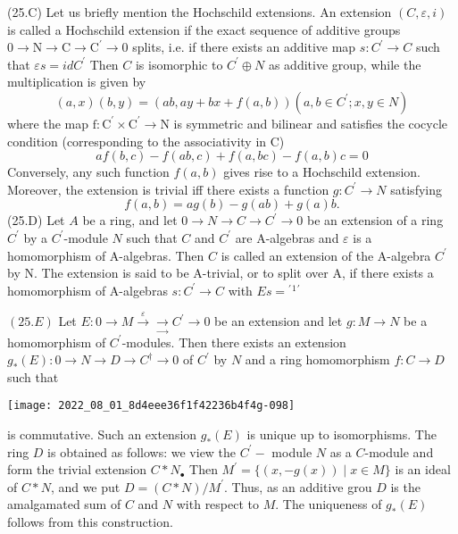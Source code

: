 (25.C) Let us briefly mention the Hochschild extensions. An extension $(C, \varepsilon, i)$ is called a Hochschild extension if the exact sequence of additive groups $0 \rightarrow \mathrm{N} \rightarrow \mathrm{C} \rightarrow \mathrm{C}^{\prime} \rightarrow 0$ splits, i.e. if there exists an additive map $s: C^{\prime} \rightarrow C$ such that $\varepsilon s=i d C^{\prime}$ Then $C$ is isomorphic to $C^{\prime} \oplus N$ as additive group, while the multiplication is given by
$$
(a, x)(b, y)=(a b, a y+b x+f(a, b))\left(a, b \in C^{\prime} ; x, y \in N\right)
$$
where the map $\mathrm{f}: \mathrm{C}^{\prime} \times \mathrm{C}^{\prime} \rightarrow \mathrm{N}$ is symmetric and bilinear and satisfies the cocycle condition (corresponding to the associativity in C)
$$
a f(b, c)-f(a b, c)+f(a, b c)-f(a, b) c=0
$$
Conversely, any such function $f(a, b)$ gives rise to a Hochschild extension. Moreover, the extension is trivial iff there exists a function $g: C^{\prime} \rightarrow N$ satisfying
$$
f(a, b)=a g(b)-g(a b)+g(a) b .
$$
(25.D) Let $A$ be a ring, and let $0 \rightarrow N \rightarrow C \rightarrow C^{\prime} \rightarrow 0$ be an extension of a ring $C^{\prime}$ by a $C^{\prime}$-module $N$ such that $C$ and $C^{\prime}$ are A-algebras and $\varepsilon$ is a homomorphism of A-algebras. Then $C$ is called an extension of the A-algebra $C^{\prime}$ by $\mathrm{N} .$ The extension is said to be A-trivial, or to split over A, if there exists a homomorphism of A-algebras $s: C^{\prime} \rightarrow C$ with $E s={ }^{\prime}{ }^{1}{ }^{\prime}$

$(25 . E)$ Let $E: 0 \rightarrow M \stackrel{\varepsilon}{\rightarrow} \underset{\rightarrow}{\rightarrow} C^{\prime} \rightarrow 0$ be an extension and let $g: M \rightarrow N$ be a homomorphism of $C^{\prime}$-modules. Then there exists an extension $g_{*}(E): 0 \rightarrow N \rightarrow D \rightarrow C^{\dagger} \rightarrow 0$ of $C^{\prime}$ by $N$ and a ring homomorphism $f: C \rightarrow D$ such that

\texttt{[image: 2022\_08\_01\_8d4eee36f1f42236b4f4g-098]}

is commutative. Such an extension $g_{*}(E)$ is unique up to isomorphisms. The ring $D$ is obtained as follows: we view the $C^{\prime}-$ module $N$ as a $C$-module and form the trivial extension $C * N_{\bullet}$ Then $M^{\prime}=\{(x,-g(x)) \mid x \in M\}$ is an ideal of $C * N$, and we put $D=(C * N) / M^{\prime}$. Thus, as an additive grou $D$ is the amalgamated sum of $C$ and $N$ with respect to $M$. The uniqueness of $g_{*}(E)$ follows from this construction.

